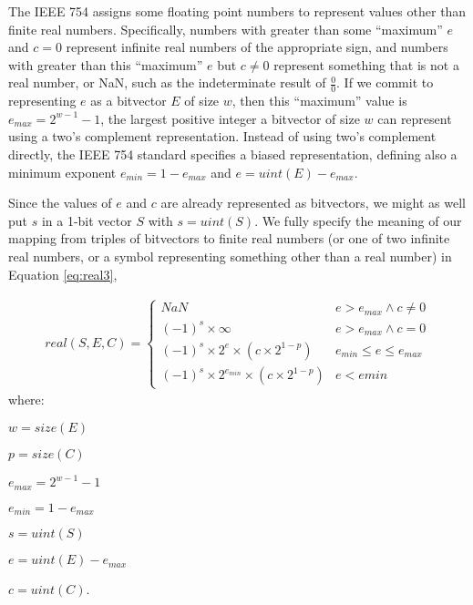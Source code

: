 \documentclass[letterpaper,10pt]{article}
\begin{document}
The IEEE 754 assigns some floating point numbers to represent values other than finite real numbers. Specifically, numbers with greater than some ``maximum'' $e$ and $c = 0$ represent infinite real numbers of the appropriate sign, and numbers with greater than this ``maximum'' $e$ but $c \neq 0$ represent something that is not a real number, or NaN, such as the indeterminate result of $\frac{0}{0}$. If we commit to representing $e$ as a bitvector $E$ of size $w$, then this ``maximum'' value is $e_{max} = 2^{w-1} - 1$, the largest positive integer a bitvector of size $w$ can represent using a two's complement representation. Instead of using two's complement directly, the IEEE 754 standard specifies a biased representation, defining also a minimum exponent $e_{min} = 1 - e_{max}$ and $e = uint(E) - e_{max}$.

Since the values of $e$ and $c$ are already represented as bitvectors, we might as well put $s$ in a 1-bit vector $S$ with $s = uint(S)$. We fully specify the meaning of our mapping from triples of bitvectors to finite real numbers (or one of two infinite real numbers, or a symbol representing something other than a real number) in Equation \ref{eq:real3},

\begin{align} \label{eq:real3}
 real(S, E, C) =
 \begin{cases}
  NaN                                                   & e > e_{max} \land c \neq 0  \\
  (-1)^s \times \infty                                  & e > e_{max} \land c = 0     \\
  (-1)^s \times 2^e \times (c \times 2^{1 - p})         & e_{min} \leq e \leq e_{max} \\
  (-1)^s \times 2^{e_{min}} \times (c \times 2^{1 - p}) & e < emin
 \end{cases}
\end{align}
where:
\begin{description}
 \item $w = size(E)$
 \item $p = size(C)$
 \item $e_{max} = 2^{w-1} - 1$
 \item $e_{min} = 1 - e_{max}$
 \item $s = uint(S)$
 \item $e = uint(E) - e_{max}$
 \item $c = uint(C)$.
\end{description}
\end{document}

